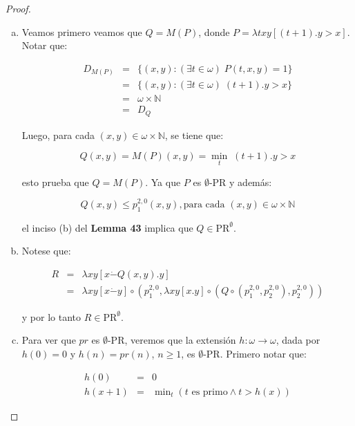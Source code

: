   \begin{proof}
    \begin{enumerate}[a)]
      \item Veamos primero veamos que $Q=M(P)$, donde $P=\lambda txy\left[(t+1).y > x\right]$. Notar que:

        \begin{eqnarray}
          \nonumber D_{M(P)} &=& \{(x,y): (\exists t \in \omega) \; P(t,x,y) = 1\} \\
          \nonumber &=& \{(x,y): (\exists t \in \omega) \; (t+1).y > x \} \\
          \nonumber &=& \omega \times \mathbb{N} \\
          \nonumber &=& D_{Q}
        \end{eqnarray}

        \par Luego, para cada $(x,y) \in \omega \times \mathbb{N}$, se tiene que:

        \[
          Q(x,y) = M(P)(x,y) = \min_{t} \; (t+1).y > x
        \]

        \par esto prueba que $Q=M(P)$. Ya que $P$ es $\emptyset$-PR y además:

        \[
          Q(x,y) \leq p_{1}^{2,0}(x,y), \text{para cada }(x,y) \in \omega \times \mathbb{N}
        \]

        \par el inciso (b) del \textbf{Lemma 43} implica que $Q \in \mathrm{PR}^{\emptyset}$.
      \item Notese que:

        \begin{eqnarray}
          \nonumber R &=& \lambda xy\left[x \dot{-}Q(x,y).y\right] \\
          \nonumber &=& \lambda xy \left[x \dot{-}y\right] \circ (p_{1}^{2,0}, \lambda xy \left[x.y\right] \circ (Q
            \circ (p_{1}^{2,0}, p_{2}^{2,0}), p_{2}^{2,0}))
        \end{eqnarray}

        \par y por lo tanto $R \in \mathrm{PR}^{\emptyset}$.
      \item Para ver que $pr$ es $\emptyset$-PR, veremos que la extensión $h: \omega \rightarrow \omega$, dada por
        $h(0)=0$ y $h(n)=pr(n)$, $n \geq 1$, es $\emptyset$-PR. Primero notar que:

        \begin{eqnarray}
          \nonumber h(0) &=& 0 \\
          \nonumber h(x+1) &=& \min\nolimits_{t}\left(t \text{ es primo} \wedge t > h(x)\right)
        \end{eqnarray}


\end{enumerate}
\end{proof}
